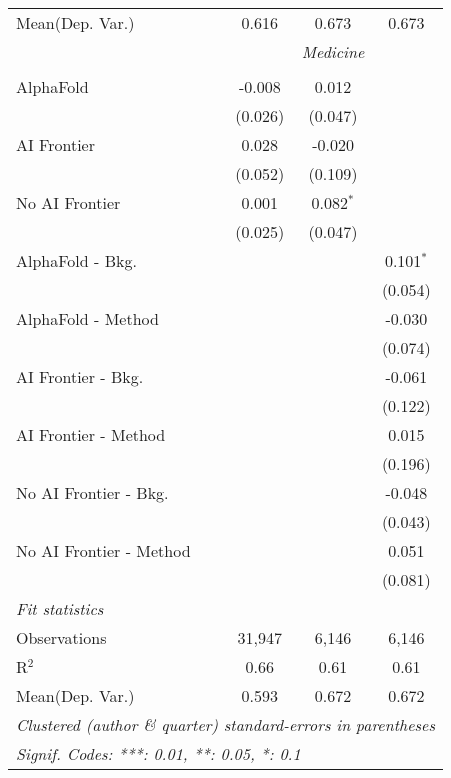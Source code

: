 \begin{tabular}{lccc}
Mean(Dep. Var.) & 0.616 & 0.673 & 0.673 \\
 & \multicolumn{3}{c}{\textit{Medicine}} \\ \\
   AlphaFold               & -0.008  & 0.012       &   \\   
                           & (0.026) & (0.047)     &   \\   
   AI Frontier             & 0.028   & -0.020      &   \\   
                           & (0.052) & (0.109)     &   \\   
   No AI Frontier          & 0.001   & 0.082$^{*}$ &   \\   
                           & (0.025) & (0.047)     &   \\   
   AlphaFold - Bkg.        &         &             & 0.101$^{*}$\\   
                           &         &             & (0.054)\\   
   AlphaFold - Method      &         &             & -0.030\\   
                           &         &             & (0.074)\\   
   AI Frontier - Bkg.      &         &             & -0.061\\   
                           &         &             & (0.122)\\   
   AI Frontier - Method    &         &             & 0.015\\   
                           &         &             & (0.196)\\   
   No AI Frontier - Bkg.   &         &             & -0.048\\   
                           &         &             & (0.043)\\   
   No AI Frontier - Method &         &             & 0.051\\   
                           &         &             & (0.081)\\   
   \midrule
   \emph{Fit statistics}\\
   Observations            & 31,947  & 6,146       & 6,146\\  
   R$^2$                   & 0.66    & 0.61        & 0.61\\  
Mean(Dep. Var.) & 0.593 & 0.672 & 0.672 \\
   \midrule \midrule
   \multicolumn{4}{l}{\emph{Clustered (author \& quarter) standard-errors in parentheses}}\\
   \multicolumn{4}{l}{\emph{Signif. Codes: ***: 0.01, **: 0.05, *: 0.1}}\\
\end{tabular}
\par\endgroup
